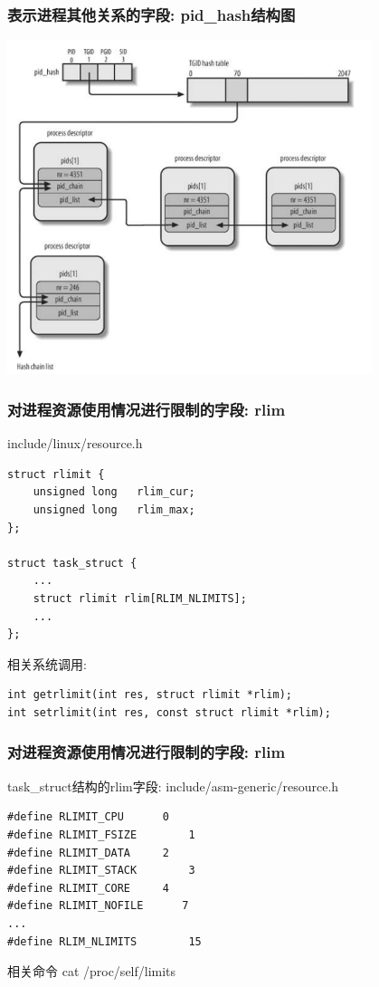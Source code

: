 \documentclass[xcolor=svgnames]{beamer}
\begin{document}
\begin{CJK*}{UTF8}{gbsn}
\begin{frame}[fragile]
\frametitle{表示进程其他关系的字段: pid\_hash结构图} 
\includegraphics[width=0.8\textwidth]{pidhashes.png}
\end{frame}

\begin{frame}[fragile]
\frametitle{对进程资源使用情况进行限制的字段: rlim}
\begin{block}{include/linux/resource.h}
\begin{verbatim}
struct rlimit {
    unsigned long   rlim_cur;
    unsigned long   rlim_max;
};

struct task_struct {
    ...
    struct rlimit rlim[RLIM_NLIMITS];
    ...
};
\end{verbatim}
\end{block}
\begin{block}{相关系统调用:}
\begin{verbatim}
int getrlimit(int res, struct rlimit *rlim);
int setrlimit(int res, const struct rlimit *rlim);
\end{verbatim}
\end{block}
\end{frame}

\begin{frame}[fragile]
\frametitle{对进程资源使用情况进行限制的字段: rlim}
\begin{block}{task\_struct结构的rlim字段: include/asm-generic/resource.h}
\begin{verbatim}
#define RLIMIT_CPU      0   
#define RLIMIT_FSIZE        1  
#define RLIMIT_DATA     2   
#define RLIMIT_STACK        3 
#define RLIMIT_CORE     4   
#define RLIMIT_NOFILE      7  
...
#define RLIM_NLIMITS        15
\end{verbatim}
\end{block}
\begin{block}{相关命令}
cat /proc/self/limits
\end{block}
\end{frame}


\end{CJK*}
\end{document}
